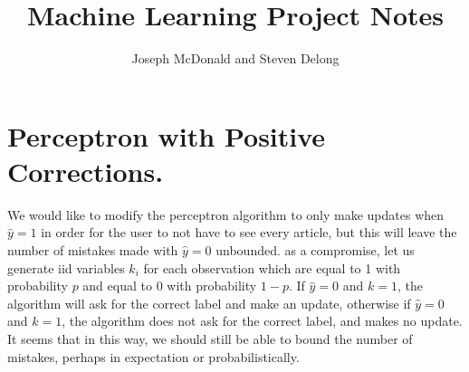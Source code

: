 \documentclass{article}
\title{Machine Learning Project Notes}
\author{Joseph McDonald and Steven Delong}
\begin{document}
\maketitle

\section*{Perceptron with Positive Corrections.}

We would like to modify the perceptron algorithm to only make updates when $\hat{y} = 1$ in order for the user to not have to see every article, but this will leave the number of mistakes made with $\hat{y} = 0$ unbounded.  as a compromise, let us generate iid variables $k_i$ for each observation which are equal to 1 with probability $p$ and equal to $0$ with probability $1-p$.  If $\hat{y} = 0$ and $k=1$, the algorithm will ask for the correct label and make an update, otherwise if $\hat{y} = 0$ and $k=1$, the algorithm does not ask for the correct label, and makes no update.  It seems that in this way, we should still be able to bound the number of mistakes, perhaps in expectation or probabilistically.\\
\end{document}
